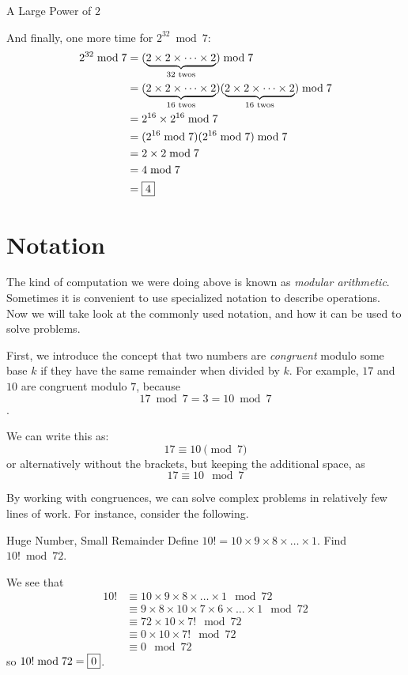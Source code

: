 \documentclass[a4paper,10pt]{report}
\begin{document}
\begin{problem}{A Large Power of \(2\)}
\begin{solution}
  And finally, one more time for \(2^{32} \bmod 7\): \begin{align*}
   2^{32} \bmod 7
   &= (\underbrace{2 \times 2 \times \dots \times 2}_{32\text{ twos}}) \bmod 7 \\
   &= (\underbrace{2 \times 2 \times \dots \times 2}_{16\text{ twos}})
   (\underbrace{2 \times 2 \times \dots \times 2}_{16\text{ twos}}) \bmod 7 \\
   &= 2^{16}\times2^{16} \bmod 7 \\
   &= (2^{16} \bmod 7)(2^{16} \bmod 7) \bmod 7 \\
   &= 2 \times 2 \bmod 7 \\
   &= 4 \bmod 7 \\
   &= \Ans{4}
  \end{align*}

 \end{solution}
\end{problem}

\section{Notation}

The kind of computation we were doing above is known as \emph{modular
arithmetic}. Sometimes it is convenient to use specialized notation to describe
operations. Now we will take look at the commonly used notation, and how it can
be used to solve problems.

First, we introduce the concept that two numbers are \emph{congruent} modulo
some base \(k\) if they have the same remainder when divided by \(k\). For
example, \(17\) and \(10\) are congruent modulo \(7\), because \[ 17 \bmod 7 =
3 = 10 \bmod 7 \].

We can write this as: \[
 17 \equiv 10 \pmod 7
\]
or alternatively without the brackets, but keeping the additional space, as \[
 17 \equiv 10 \mod 7
\]

By working with congruences, we can solve complex problems in relatively few
lines of work. For instance, consider the following.

\begin{problem}{Huge Number, Small Remainder}
 Define \(10! = 10 \times 9 \times 8 \times \dots \times 1\). Find \(10! \bmod 72\).

 \begin{solution}
  We see that \begin{align*}
   10!
   &\equiv 10 \times 9 \times 8 \times \dots \times 1 \mod {72} \\
   &\equiv 9 \times 8 \times 10 \times 7 \times 6 \times \dots \times 1
   \mod {72} \\
   &\equiv 72 \times 10 \times 7! \mod {72} \\
   &\equiv 0 \times 10 \times 7! \mod {72} \\
   &\equiv 0 \mod {72}
  \end{align*}
  so \(10! \bmod 72 = \Ans{0}\).
 \end{solution}
\end{problem}
\end{document}
